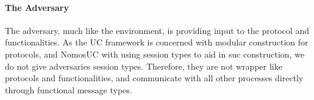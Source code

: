 %


\paragraph{The Adversary}
The adversary, much like the environment, is providing input to the protocol and functionalities.
As the UC framework is concerned with modular construction for protocols, and NomosUC with using session types to aid in suc construction, we do not give adversaries session types.
Therefore, they are not wrapper like protocols and functionalities, and communicate with all other processes directly through functional message types.

